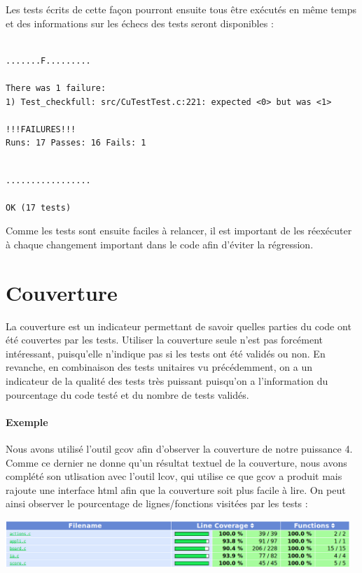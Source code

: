 \documentclass{report}
\begin{document}
Les tests écrits de cette façon pourront ensuite tous être exécutés en même temps et des informations sur les échecs des tests seront disponibles :

\begin{scriptsize}
\begin{lstlisting}

.......F.........

There was 1 failure:
1) Test_checkfull: src/CuTestTest.c:221: expected <0> but was <1>

!!!FAILURES!!!
Runs: 17 Passes: 16 Fails: 1

\end{lstlisting}
\begin{lstlisting}

.................

OK (17 tests)
\end{lstlisting}
\end{scriptsize}

Comme les tests sont ensuite faciles à relancer, il est important de les réexécuter à chaque changement important dans le code afin d'éviter la régression.

\section{Couverture}
La couverture est un indicateur permettant de savoir quelles parties du code ont été couvertes par les tests. Utiliser la couverture seule n'est pas forcément intéressant, puisqu'elle n'indique pas si les tests ont été validés ou non. En revanche, en combinaison des tests unitaires vu précédemment, on a un indicateur de la qualité des tests très puissant puisqu'on a l'information du pourcentage du code testé et du nombre de tests validés.
\paragraph{Exemple}
Nous avons utilisé l'outil gcov afin d'observer la couverture de notre puissance 4. Comme ce dernier ne donne qu'un résultat textuel de la couverture, nous avons complété son utlisation avec l'outil lcov, qui utilise ce que gcov a produit mais rajoute une interface html afin que la couverture soit plus facile à lire. On peut ainsi observer le pourcentage de lignes/fonctions visitées par les tests :

\begin{center}
  \includegraphics[width=13cm]{couverture1.png}
\end{center}
\end{document}
